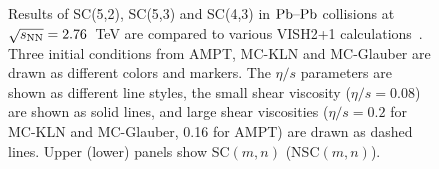 \begin{figure}[!]
\begin{center}
        \caption{Results of  SC(5,2), SC(5,3) and SC(4,3) in $\textnormal{Pb--Pb}$ collisions at $\sqrt{s_{\textnormal{NN}}}=2.76$~TeV are compared to various VISH2+1 calculations~\cite{Zhu:2016puf}. Three initial conditions from AMPT, MC-KLN and MC-Glauber are drawn as different colors and markers. The $\eta/s$ parameters are shown as different line styles, the small shear viscosity ($\eta/s=0.08$) are shown as solid lines, and large shear viscosities ($\eta/s=0.2$ for MC-KLN and MC-Glauber, 0.16 for AMPT) are drawn as dashed lines. Upper (lower) panels show SC$(m,n)$ (NSC$(m,n)$).}
        \label{fig:Figure_6}
        \end{center}   
 \end{figure}
 
